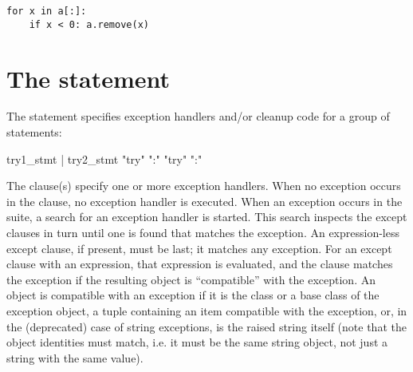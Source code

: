 
\begin{verbatim}
for x in a[:]:
    if x < 0: a.remove(x)
\end{verbatim}


\section{The  statement\label{try}}

The  statement specifies exception handlers and/or cleanup
code for a group of statements:

\begin{productionlist}
   {try1_stmt | try2_stmt}
             {"try" ":" }
             {"try" ":" }
\end{productionlist}


The  clause(s) specify one or more exception handlers.
When no exception occurs in the
 clause, no exception handler is executed.  When an
exception occurs in the  suite, a search for an exception
handler is started.  This search inspects the except clauses in turn until
one is found that matches the exception.  An expression-less except
clause, if present, must be last; it matches any exception.  For an
except clause with an expression, that expression is evaluated, and the
clause matches the exception if the resulting object is ``compatible''
with the exception.  An object is compatible with an exception if it
is the class or a base class of the exception object, a tuple
containing an item compatible with the exception, or, in the
(deprecated) case of string exceptions, is the raised string itself
(note that the object identities must match, i.e. it must be the same
string object, not just a string with the same value).


